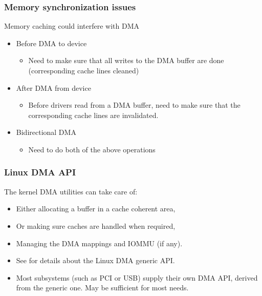 \begin{frame}
  \frametitle{Memory synchronization issues}
  Memory caching could interfere with DMA
  \begin{itemize}
  \item Before DMA to device
    \begin{itemize}
    \item Need to make sure that all writes to the DMA buffer are done
          (corresponding cache lines cleaned)
    \end{itemize}
  \item After DMA from device
    \begin{itemize}
    \item Before drivers read from a DMA buffer, need to make sure
      that the corresponding cache lines are invalidated.
    \end{itemize}
  \item Bidirectional DMA
    \begin{itemize}
    \item Need to do both of the above operations
    \end{itemize}
  \end{itemize}
\end{frame}

\begin{frame}
  \frametitle{Linux DMA API}
  The kernel DMA utilities can take care of:
  \begin{itemize}
  \item Either allocating a buffer in a cache coherent area,
  \item Or making sure caches are handled when required,
  \item Managing the DMA mappings and IOMMU (if any).
  \item See  for details about the
    Linux DMA generic API.
  \item Most subsystems (such as PCI or USB) supply their own DMA
    API, derived from the generic one. May be sufficient for most
    needs.
  \end{itemize}
\end{frame}

